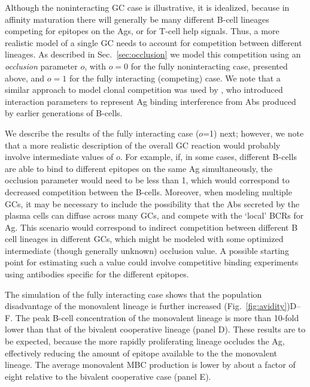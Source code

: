 \documentclass[utf8]{frontiersHLTH}%
\newcommand{\cred}[1]{#1} %
\newcommand{\vo}[1]{#1} %
\newcommand{\fig}[1]{Fig.~\ref{fig:#1}}
\newcommand{\Sec}[1]{Sec.~\ref{sec:#1}}
\renewcommand{\sec}[1]{\Sec{#1}}
\newcommand{\occl}{o}
\begin{document}
Although the noninteracting GC case is illustrative, it is idealized, because
in affinity maturation there will generally be many different B-cell
lineages competing for epitopes on the Ags, or for T-cell help
signals. Thus, a more realistic model of a single GC needs to account for
competition between different lineages. As described in \sec{occlusion} we
model this competition using an \textit{occlusion} parameter $\occl$, with $\occl=0$
for the fully noninteracting case, presented above, and $\occl=1$ for the fully interacting
(competing) case.
%
\cred{We note that a similar approach to model clonal competition was used by
\citet{Yan20}, who introduced interaction parameters to represent Ag
binding interference from Abs produced by earlier generations of B-cells.}

We describe the results of the fully interacting case ($\occl$=1) next; however, 
we note that a more realistic description of the overall GC reaction would probably
involve intermediate values of $o$. For example,
if, in some cases, different B-cells are able to bind to different epitopes
on the same Ag simultaneously, the occlusion parameter would need to be less than 1, which would
correspond to decreased competition between the B-cells. Moreover, when modeling
multiple GCs, it may be necessary to include the possibility that the Abs secreted by the plasma cells
can diffuse across many GCs, and compete with the `local' BCRs for
Ag.\cite{zhang13} This scenario would correspond to indirect
competition between different B cell lineages in different GCs, which might
be modeled with some optimized intermediate (though generally unknown) occlusion value.
\vo{A possible starting point for estimating such a value
could involve competitive binding experiments using antibodies specific for
the different epitopes.} 

The simulation of the fully interacting case shows that the
population disadvantage of the monovalent lineage is further increased
(\fig{avidity})D--F. The peak B-cell concentration of the monovalent lineage is more
than 10-fold lower than that of the bivalent cooperative lineage (panel D). These
results are to be expected, because the more rapidly proliferating lineage
occludes the Ag, effectively reducing the amount of epitope available to the
the monovalent lineage. The average monovalent MBC production is lower
by about a factor of \vo{eight} relative to the bivalent cooperative case (panel E).
\end{document}
